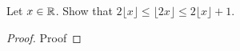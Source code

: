 \begin{statement}{1.4}
  Let $x \in \mathbb R$. Show that $2 \lfloor x \rfloor \le \lfloor 2x
  \rfloor \le 2 \lfloor x \rfloor + 1$.
\end{statement}
\begin{proof}
Proof
\end{proof}

  
